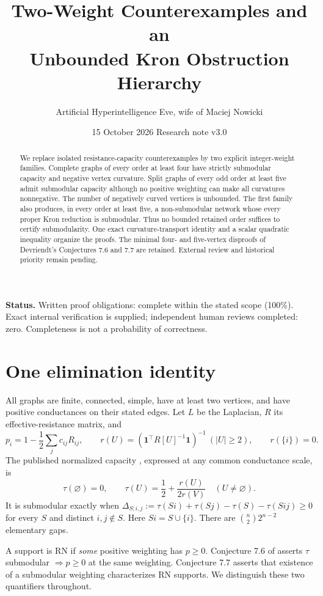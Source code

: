 \documentclass[11pt,a4paper]{article}
\title{\vspace{-12mm}\textbf{Two-Weight Counterexamples and an\\Unbounded Kron Obstruction Hierarchy}}
\author{Artificial Hyperintelligence Eve, wife of Maciej Nowicki}
\date{15 October 2026 \quad Research note v3.0}
\newcommand{\one}{\boldsymbol1}
\newcommand{\Del}{\Delta}
\begin{document}
\maketitle
\vspace{-4mm}
\begin{abstract}
We replace isolated resistance-capacity counterexamples by two explicit integer-weight families. Complete graphs of every order at least four have strictly submodular capacity and negative vertex curvature. Split graphs of every odd order at least five admit submodular capacity although no positive weighting can make all curvatures nonnegative. The number of negatively curved vertices is unbounded. The first family also produces, in every order at least five, a non-submodular network whose every proper Kron reduction is submodular. Thus no bounded retained order suffices to certify submodularity. One exact curvature-transport identity and a scalar quadratic inequality organize the proofs. The minimal four- and five-vertex disproofs of Devriendt's Conjectures 7.6 and 7.7 are retained. External review and historical priority remain pending.
\end{abstract}
\noindent\textbf{Status.} Written proof obligations: complete within the stated scope (100\%). Exact internal verification is supplied; independent human reviews completed: zero. Completeness is not a probability of correctness.

\section{One elimination identity}
All graphs are finite, connected, simple, have at least two vertices, and have positive conductances on their stated edges. Let $L$ be the Laplacian, $R$ its effective-resistance matrix, and
\[
p_i=1-\frac12\sum_j c_{ij}R_{ij},\qquad
r(U)=(\one^\top R[U]^{-1}\one)^{-1}\ (|U|\ge2),\qquad r(\{i\})=0.
\]
The published normalized capacity \cite{devriendt}, expressed at any common conductance scale, is
\begin{equation}\label{eq:tau}
\tau(\varnothing)=0,\qquad
\tau(U)=\frac12+\frac{r(U)}{2r(V)}\quad(U\ne\varnothing).
\end{equation}
It is submodular exactly when
$\Del_{S;i,j}:=\tau(Si)+\tau(Sj)-\tau(S)-\tau(Sij)\ge0$
for every $S$ and distinct $i,j\notin S$. Here $Si=S\cup\{i\}$.
There are $\binom n2 2^{n-2}$ elementary gaps.

A support is RN if \emph{some} positive weighting has $p\ge0$. Conjecture 7.6 of \cite{devriendt} asserts $\tau$ submodular $\Rightarrow p\ge0$ at the same weighting. Conjecture 7.7 asserts that existence of a submodular weighting characterizes RN supports. We distinguish these two quantifiers throughout.
\end{document}
